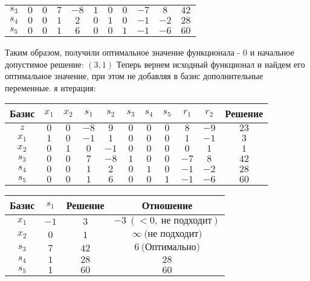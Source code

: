 \documentclass{article}%
\begin{document}
\begin{flushleft}
\begin{tabular}{|c|ccccccccc|c|}
$s_{3}$&$0$&$0$&$7$&$-8$&$1$&$0$&$0$&$-7$&$8$&$42$\\%
$s_{4}$&$0$&$0$&$1$&$2$&$0$&$1$&$0$&$-1$&$-2$&$28$\\%
$s_{5}$&$0$&$0$&$1$&$6$&$0$&$0$&$1$&$-1$&$-6$&$60$\\%
\hline%
\end{tabular}%
\newline%
\newline%
Таким образом, получили оптимальное значение функционала {-} 0 и начальное допустимое решение: %
$(3, 1)$%
\newline%
Теперь вернем исходный функционал и найдем его оптимальное значение, при этом не добавляя в базис дополнительные переменные.%
я итерация: %
\newline%
\newline%
\renewcommand{\arraystretch}{1.3}%
\begin{tabular}{|c|ccccccccc|c|}%
\hline%
Базис&$x_{1}$&$x_{2}$&$s_{1}$&$s_{2}$&$s_{3}$&$s_{4}$&$s_{5}$&$r_{1}$&$r_{2}$&Решение\\%
\hline%
$z$&$0$&$0$&$-8$&$9$&$0$&$0$&$0$&$8$&$-9$&$23$\\%
\hline%
$x_{1}$&$1$&$0$&$-1$&$1$&$0$&$0$&$0$&$1$&$-1$&$3$\\%
$x_{2}$&$0$&$1$&$0$&$-1$&$0$&$0$&$0$&$0$&$1$&$1$\\%
$s_{3}$&$0$&$0$&$7$&$-8$&$1$&$0$&$0$&$-7$&$8$&$42$\\%
$s_{4}$&$0$&$0$&$1$&$2$&$0$&$1$&$0$&$-1$&$-2$&$28$\\%
$s_{5}$&$0$&$0$&$1$&$6$&$0$&$0$&$1$&$-1$&$-6$&$60$\\%
\hline%
\end{tabular}%
\newline%
\newline%
\newline%
\begin{tabular}{|cccc|}%
\hline%
Базис&$s_{1}$&Решение&Отношение\\%
\hline%
$x_{1}$&$-1$&$3$&$-3\: (< 0, \: \text{не подходит})$\\%
$x_{2}$&$0$&$1$&$\infty \: \text{(не подходит)}$\\%
$s_{3}$&$7$&$42$&$6\: \text{(Оптимально)}$\\%
$s_{4}$&$1$&$28$&$28$\\%
$s_{5}$&$1$&$60$&$60$\\%
\hline%
\end{tabular}%
\newline%

\end{flushleft}
\end{document}

